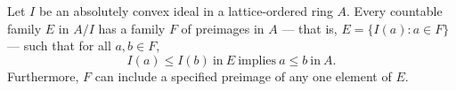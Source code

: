 Let $I$ be an absolutely convex ideal in a lattice-ordered ring $A$. Every countable family $E$ in $A/I$ has a family $F$ of preimages in $A$ — that is, $E = \{I(a) : a \in F\}$ — such that for all $a, b \in F$,
$$I(a) \leq I(b) \ \text{in} \ E \ \text{implies} \ a \leq b \ \text{in} \ A.$$
Furthermore, $F$ can include a specified preimage of any one element of $E$.